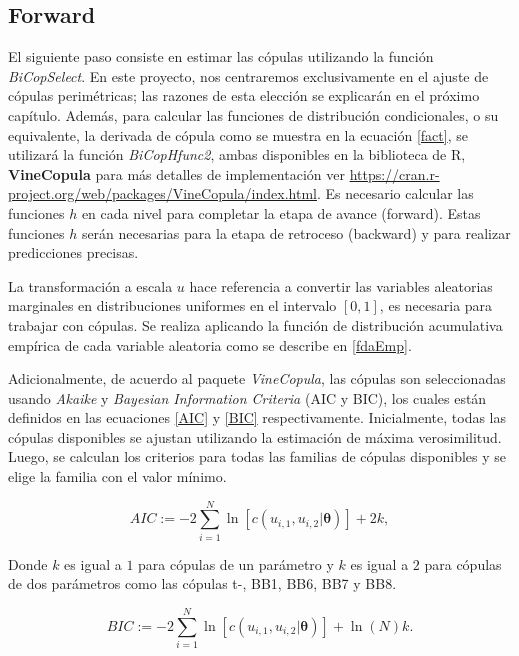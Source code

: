 
\subsection{Forward}

El siguiente paso consiste en estimar las cópulas utilizando la función \textit{BiCopSelect}. En este proyecto, nos centraremos exclusivamente en el ajuste de cópulas perimétricas; las razones de esta elección se explicarán en el próximo capítulo. Además, para calcular las funciones de distribución condicionales, o su equivalente, la derivada de cópula como se muestra en la ecuación \eqref{fact}, se utilizará la función \textit{BiCopHfunc2}, ambas disponibles en la biblioteca de R, \textbf{VineCopula} para más detalles de implementación ver \url{https://cran.r-project.org/web/packages/VineCopula/index.html}. Es necesario calcular las funciones $h$ en cada nivel para completar la etapa de avance (forward). Estas funciones $h$ serán necesarias para la etapa de retroceso (backward) y para realizar predicciones precisas.

La transformación a escala $u$ hace referencia a convertir las variables aleatorias marginales en distribuciones uniformes en el intervalo $[0, 1]$, es necesaria para trabajar con cópulas. Se realiza aplicando la función de distribución acumulativa empírica de cada variable aleatoria como se describe en \eqref{fdaEmp}.

Adicionalmente, de acuerdo al paquete \textit{VineCopula}, las cópulas son seleccionadas usando \textit{Akaike} y \textit{Bayesian Information Criteria} (AIC y BIC), los cuales están definidos en las ecuaciones \ref{AIC} y \ref{BIC} respectivamente. Inicialmente, todas las cópulas disponibles se ajustan utilizando la estimación de máxima verosimilitud. Luego, se calculan los criterios para todas las familias de cópulas disponibles y se elige la familia con el valor mínimo.

\begin{equation}\label{AIC}
    AIC := -2 \sum_{i=1}^N \ln[c(u_{i,1},u_{i,2}|\boldsymbol{\theta})] + 2k,
\end{equation}

Donde $k$ es igual a $1$ para cópulas de un parámetro y $k$ es igual a $2$ para cópulas de dos parámetros como las cópulas t-, BB1, BB6, BB7 y BB8.

\begin{equation}\label{BIC}
    BIC := -2 \sum_{i=1}^N \ln[c(u_{i,1},u_{i,2}|\boldsymbol{\theta})] + \ln(N)k.
\end{equation}

